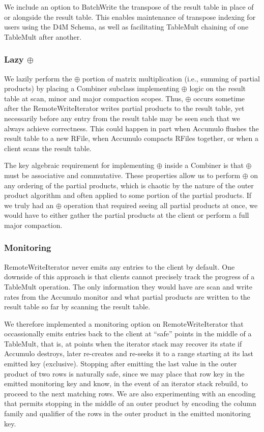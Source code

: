We include an option to BatchWrite the transpose of the result table in place of or alongside
the result table. This enables maintenance of transpose indexing for users using the D4M Schema, as well as
facilitating TableMult chaining of one TableMult after another.

\subsubsection{Lazy $\oplus$}
We lazily perform the $\oplus$ portion of matrix multiplication (i.e., summing of partial products)
by placing a Combiner subclass implementing $\oplus$ logic on the result table at scan, minor and major compaction scopes.
Thus, $\oplus$ occurs sometime after the RemoteWriteIterator writes partial products to the result table,
yet necessarily before any entry from the result table may be seen such that we always achieve correctness.
This could happen in part when Accumulo flushes the result table to a new RFile, when Accumulo compacts RFiles 
together, or when a client scans the result table. 

The key algebraic requirement for implementing $\oplus$ inside a Combiner
is that $\oplus$ must be associative and commutative.
These properties allow us to perform $\oplus$ on any ordering of the partial products,
which is chaotic by the nature of the outer product algorithm and often applied to some portion of 
the partial products.%
If we truly had an $\oplus$ operation that required seeing all partial products at once,
we would have to either gather the partial products at the client or perform a full major compaction.


\subsubsection{Monitoring}
RemoteWriteIterator never emits any entries to the client by default. 
One downside of this approach is that clients cannot precisely track the progress of a TableMult operation.
The only information they would have are scan and write rates from the Accumulo monitor and what partial products 
are written to the result table so far by scanning the result table.

We therefore implemented a monitoring option on RemoteWriteIterator that occassionally emits entries
back to the client at ``safe'' points in the middle of a TableMult, that is,
at points when the iterator stack may recover its state if Accumulo destroys, later re-creates and re-seeks it
to a range starting at its last emitted key (exclusive).
Stopping after emitting the last value in the outer product of two rows is naturally safe, since we may place that row key
in the emitted monitoring key and know, in the event of an iterator stack rebuild, to proceed to the next matching rows.
We are also experimenting with an encoding that permits stopping in the middle of an outer product by encoding the 
column family and qualifier of the rows in the outer product in the emitted monitoring key.

